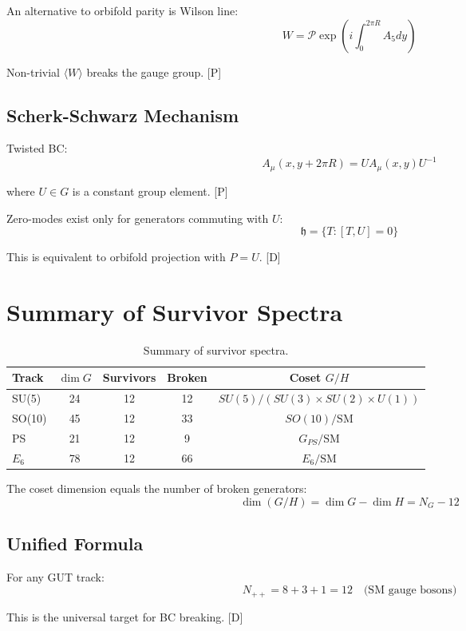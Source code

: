 \documentclass[11pt,a4paper]{article}
\newcommand{\tagD}{\textcolor{blue!70!black}{[D]}}
\newcommand{\tagP}{\textcolor{green!50!black}{[P]}}
\begin{document}
An alternative to orbifold parity is Wilson line:
\begin{equation}
\label{eq:wilson}
W = \mathcal{P} \exp\left(i \int_0^{2\pi R} A_5 dy\right)
\end{equation}

Non-trivial $\langle W \rangle$ breaks the gauge group. \tagP

\subsection{Scherk-Schwarz Mechanism}

Twisted BC:
\begin{equation}
\label{eq:scherk-schwarz}
A_\mu(x, y + 2\pi R) = U A_\mu(x, y) U^{-1}
\end{equation}

where $U \in G$ is a constant group element. \tagP

Zero-modes exist only for generators commuting with $U$:
\begin{equation}
\label{eq:ss-survivor}
\mathfrak{h} = \{T : [T, U] = 0\}
\end{equation}

This is equivalent to orbifold projection with $P = U$. \tagD

\section{Summary of Survivor Spectra}
\label{app:summary}

\begin{table}[h]
\centering
\begin{tabular}{lcccc}
\toprule
Track & $\dim G$ & Survivors & Broken & Coset $G/H$ \\
\midrule
SU(5) & 24 & 12 & 12 & $SU(5)/(SU(3) \times SU(2) \times U(1))$ \\
SO(10) & 45 & 12 & 33 & $SO(10)/\text{SM}$ \\
PS & 21 & 12 & 9 & $G_{PS}/\text{SM}$ \\
$E_6$ & 78 & 12 & 66 & $E_6/\text{SM}$ \\
\bottomrule
\end{tabular}
\caption{Summary of survivor spectra.}
\label{tab:summary}
\end{table}

The coset dimension equals the number of broken generators:
\begin{equation}
\label{eq:coset-dim}
\dim(G/H) = \dim G - \dim H = N_G - 12
\end{equation}

\subsection{Unified Formula}

For any GUT track:
\begin{equation}
\label{eq:unified}
\boxed{N_{++} = 8 + 3 + 1 = 12 \quad \text{(SM gauge bosons)}}
\end{equation}

This is the universal target for BC breaking. \tagD

\end{document}
